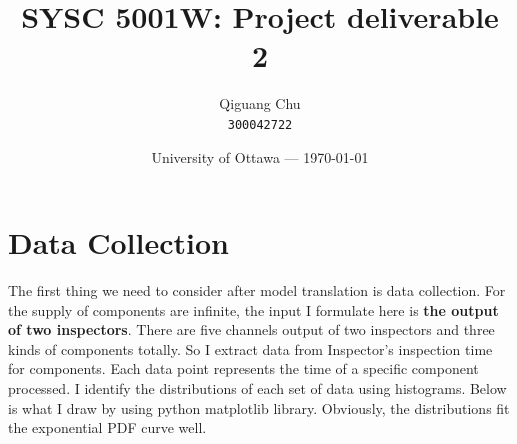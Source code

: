 \documentclass{article}
\title{SYSC 5001W: Project deliverable 2} %
\author{Qiguang Chu\\ \texttt{300042722}} %
\date{University of Ottawa --- \today} %
\begin{document}
\maketitle

\section{Data Collection}

The first thing we need to consider after model translation is data collection. For the supply of components are infinite,  the input I formulate here is \textbf{the output of two inspectors}. There are five channels output of two inspectors and three kinds of components totally. So I extract data from Inspector's inspection time for components. Each data point represents the time of a specific component processed. I identify the distributions of each set of data using histograms. Below is what I draw by using python matplotlib library. Obviously, the distributions fit the exponential PDF curve well. 
\end{document}
